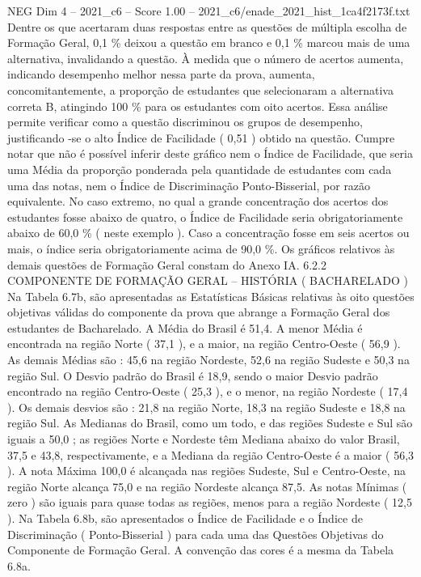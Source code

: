 \begin{textsample}{NEG Dim 4 – 2021\_c6 – Score 1.00 – 2021\_c6/enade\_2021\_hist\_1ca4f2173f.txt}
Dentre os que acertaram duas respostas entre as questões de múltipla escolha de Formação Geral, 0,1 \% deixou a questão em branco e 0,1 \% marcou mais de uma alternativa, invalidando a questão.
À medida que o número de acertos aumenta, indicando desempenho melhor nessa parte da prova, aumenta, concomitantemente, a proporção de estudantes que selecionaram a alternativa correta B, atingindo 100 \% para os estudantes com oito acertos.
Essa análise permite verificar como a questão discriminou os grupos de desempenho, justificando -se o alto Índice de Facilidade ( 0,51 ) obtido na questão.
Cumpre notar que não é possível inferir deste gráfico nem o Índice de Facilidade, que seria uma Média da proporção ponderada pela quantidade de estudantes com cada uma das notas, nem o Índice de Discriminação Ponto-Bisserial, por razão equivalente.
No caso extremo, no qual a grande concentração dos acertos dos estudantes fosse abaixo de quatro, o Índice de Facilidade seria obrigatoriamente abaixo de 60,0 \% ( neste exemplo ).
Caso a concentração fosse em seis acertos ou mais, o índice seria obrigatoriamente acima de 90,0 \%.
Os gráficos relativos às demais questões de Formação Geral constam do Anexo IA. 6.2.2 COMPONENTE DE FORMAÇÃO GERAL – HISTÓRIA ( BACHARELADO ) Na Tabela 6.7b, são apresentadas as Estatísticas Básicas relativas às oito questões objetivas válidas do componente da prova que abrange a Formação Geral dos estudantes de Bacharelado.
A Média do Brasil é 51,4.
A menor Média é encontrada na região Norte ( 37,1 ), e a maior, na região Centro-Oeste ( 56,9 ).
As demais Médias são : 45,6 na região Nordeste, 52,6 na região Sudeste e 50,3 na região Sul.
O Desvio padrão do Brasil é 18,9, sendo o maior Desvio padrão encontrado na região Centro-Oeste ( 25,3 ), e o menor, na região Nordeste ( 17,4 ).
Os demais desvios são : 21,8 na região Norte, 18,3 na região Sudeste e 18,8 na região Sul.
As Medianas do Brasil, como um todo, e das regiões Sudeste e Sul são iguais a 50,0 ; as regiões Norte e Nordeste têm Mediana abaixo do valor Brasil, 37,5 e 43,8, respectivamente, e a Mediana da região Centro-Oeste é a maior ( 56,3 ).
A nota Máxima 100,0 é alcançada nas regiões Sudeste, Sul e Centro-Oeste, na região Norte alcança 75,0 e na região Nordeste alcança 87,5.
As notas Mínimas ( zero ) são iguais para quase todas as regiões, menos para a região Nordeste ( 12,5 ).
Na Tabela 6.8b, são apresentados o Índice de Facilidade e o Índice de Discriminação ( Ponto-Bisserial ) para cada uma das Questões Objetivas do Componente de Formação Geral.
A convenção das cores é a mesma da Tabela 6.8a.

\end{textsample}

